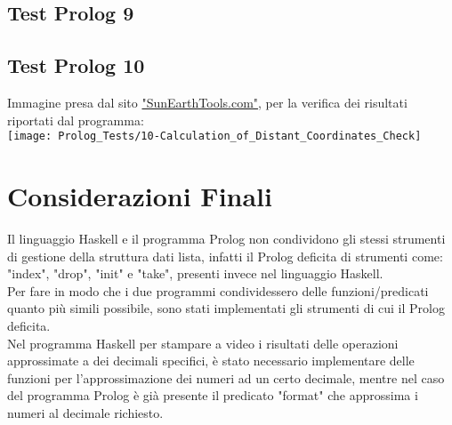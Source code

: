 \documentclass{article}
\begin{document}
\subsection*{Test Prolog 9}

\lstset{inputencoding=utf8/latin1}


\subsection*{Test Prolog 10}

\lstset{inputencoding=utf8/latin1}


	\bigskip
	Immagine presa dal sito \href{https://www.sunearthtools.com/it/tools/distance.php}{"SunEarthTools.com"}, per la verifica dei risultati riportati dal programma:\\
	\texttt{[image: Prolog\_Tests/10-Calculation\_of\_Distant\_Coordinates\_Check]}
\newpage

\section{Considerazioni Finali}
\raggedright

Il linguaggio Haskell e il programma Prolog non condividono gli stessi strumenti di gestione della struttura dati lista, infatti il Prolog deficita di strumenti come: "index", "drop", "init" e "take", presenti invece nel linguaggio Haskell.\\
Per fare in modo che i due programmi condividessero delle funzioni/predicati quanto più simili possibile, sono stati implementati gli strumenti di cui il Prolog deficita.\\
%


Nel programma Haskell per stampare a video i risultati delle operazioni approssimate a dei decimali specifici, è stato necessario implementare delle funzioni per l'approssimazione dei numeri ad un certo decimale, mentre nel caso del programma Prolog è già presente il predicato "format" che approssima i numeri al decimale richiesto.\\
%
\end{document}
